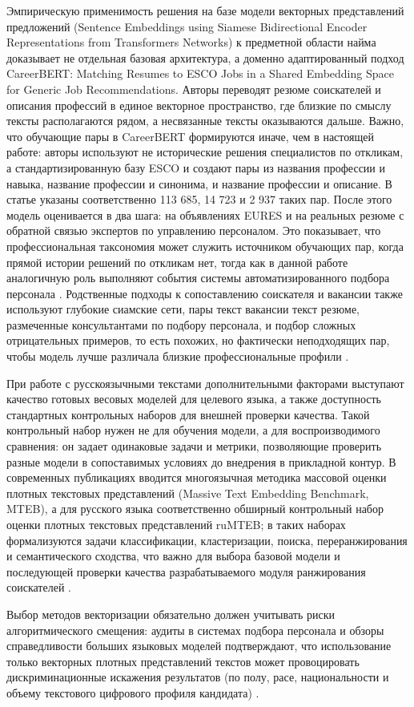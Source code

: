 Эмпирическую применимость решения на базе модели векторных представлений предложений (Sentence Embeddings using Siamese Bidirectional Encoder Representations from Transformers Networks) к предметной области найма доказывает не отдельная базовая архитектура, а доменно адаптированный подход CareerBERT: Matching Resumes to ESCO Jobs in a Shared Embedding Space for Generic Job Recommendations. Авторы переводят резюме соискателей и описания профессий в единое векторное пространство, где близкие по смыслу тексты располагаются рядом, а несвязанные тексты оказываются дальше. Важно, что обучающие пары в CareerBERT формируются иначе, чем в настоящей работе: авторы используют не исторические решения специалистов по откликам, а стандартизированную базу ESCO и создают пары из названия профессии и навыка, название профессии и синонима, и название профессии и описание. В статье указаны соответственно 113 685, 14 723 и 2 937 таких пар. После этого модель оценивается в два шага: на объявлениях EURES и на реальных резюме с обратной связью экспертов по управлению персоналом. Это показывает, что профессиональная таксономия может служить источником обучающих пар, когда прямой истории решений по откликам нет, тогда как в данной работе аналогичную роль выполняют события системы автоматизированного подбора персонала \cite{src01, src30}. Родственные подходы к сопоставлению соискателя и вакансии также используют глубокие сиамские сети, пары текст вакансии текст резюме, размеченные консультантами по подбору персонала, и подбор сложных отрицательных примеров, то есть похожих, но фактически неподходящих пар, чтобы модель лучше различала близкие профессиональные профили \cite{src04, src39, src40}.

При работе с русскоязычными текстами дополнительными факторами выступают качество готовых весовых моделей для целевого языка, а также доступность стандартных контрольных наборов для внешней проверки качества. Такой контрольный набор нужен не для обучения модели, а для воспроизводимого сравнения: он задает одинаковые задачи и метрики, позволяющие проверить разные модели в сопоставимых условиях до внедрения в прикладной контур. В современных публикациях вводится многоязычная методика массовой оценки плотных текстовых представлений (Massive Text Embedding Benchmark, MTEB), а для русского языка соответственно обширный контрольный набор оценки плотных текстовых представлений ruMTEB; в таких наборах формализуются задачи классификации, кластеризации, поиска, переранжирования и семантического сходства, что важно для выбора базовой модели и последующей проверки качества разрабатываемого модуля ранжирования соискателей \cite{src19, src20, src29}.

Выбор методов векторизации обязательно должен учитывать риски алгоритмического смещения: аудиты в системах подбора персонала и обзоры справедливости больших языковых моделей подтверждают, что использование только векторных плотных представлений текстов может провоцировать дискриминационные искажения результатов (по полу, расе, национальности и объему текстового цифрового профиля кандидата) \cite{src21, src22}.
